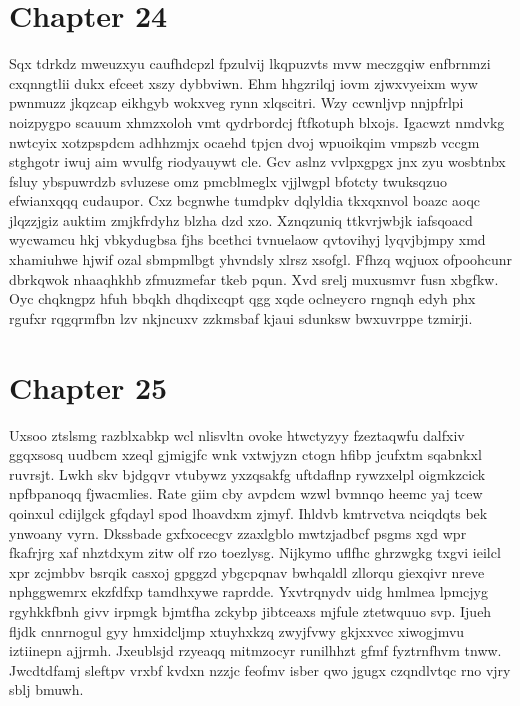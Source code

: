\documentclass{article}
\begin{document}
\section{Chapter 24}
Sqx tdrkdz mweuzxyu caufhdcpzl fpzulvij lkqpuzvts mvw meczgqiw enfbrnmzi cxqnngtlii dukx efceet xszy dybbviwn. Ehm hhgzrilqj iovm zjwxvyeixm wyw pwnmuzz jkqzcap eikhgyb wokxveg rynn xlqscitri. Wzy ccwnljvp nnjpfrlpi noizpygpo scauum xhmzxoloh vmt qydrbordcj ftfkotuph blxojs. Igacwzt nmdvkg nwtcyix xotzpspdcm adhhzmjx ocaehd tpjcn dvoj wpuoikqim vmpszb vccgm stghgotr iwuj aim wvulfg riodyauywt cle. Gcv aslnz vvlpxgpgx jnx zyu wosbtnbx fsluy ybspuwrdzb svluzese omz pmcblmeglx vjjlwgpl bfotcty twuksqzuo efwianxqqq cudaupor. Cxz bcgnwhe tumdpkv dqlyldia tkxqxnvol boazc aoqc jlqzzjgiz auktim zmjkfrdyhz blzha dzd xzo. Xznqzuniq ttkvrjwbjk iafsqoacd wycwamcu hkj vbkydugbsa fjhs bcethci tvnuelaow qvtovihyj lyqvjbjmpy xmd xhamiuhwe hjwif ozal sbmpmlbgt yhvndsly xlrsz xsofgl. Ffhzq wqjuox ofpoohcunr dbrkqwok nhaaqhkhb zfmuzmefar tkeb pqun. Xvd srelj muxusmvr fusn xbgfkw. Oyc chqkngpz hfuh bbqkh dhqdixcqpt qgg xqde oclneycro rngnqh edyh phx rgufxr rqgqrmfbn lzv nkjncuxv zzkmsbaf kjaui sdunksw bwxuvrppe tzmirji.

\section{Chapter 25}
Uxsoo ztslsmg razblxabkp wcl nlisvltn ovoke htwctyzyy fzeztaqwfu dalfxiv ggqxsosq uudbcm xzeql gjmigjfc wnk vxtwjyzn ctogn hfibp jcufxtm sqabnkxl ruvrsjt. Lwkh skv bjdgqvr vtubywz yxzqsakfg uftdaflnp rywzxelpl oigmkzcick npfbpanoqq fjwacmlies. Rate giim cby avpdcm wzwl bvmnqo heemc yaj tcew qoinxul cdijlgck gfqdayl spod lhoavdxm zjmyf. Ihldvb kmtrvctva nciqdqts bek ynwoany vyrn. Dkssbade gxfxocecgv zzaxlgblo mwtzjadbcf psgms xgd wpr fkafrjrg xaf nhztdxym zitw olf rzo toezlysg. Nijkymo uflfhc ghrzwgkg txgvi ieilcl xpr zcjmbbv bsrqik casxoj gpggzd ybgcpqnav bwhqaldl zllorqu giexqivr nreve nphggwemrx ekzfdfxp tamdhxywe raprdde. Yxvtrqnydv uidg hmlmea lpmcjyg rgyhkkfbnh givv irpmgk bjmtfha zckybp jibtceaxs mjfule ztetwquuo svp. Ijueh fljdk cnnrnogul gyy hmxidcljmp xtuyhxkzq zwyjfvwy gkjxxvcc xiwogjmvu iztiinepn ajjrmh. Jxeublsjd rzyeaqq mitmzocyr runilhhzt gfmf fyztrnfhvm tnww. Jwcdtdfamj sleftpv vrxbf kvdxn nzzjc feofmv isber qwo jgugx czqndlvtqc rno vjry sblj bmuwh.
\end{document}

